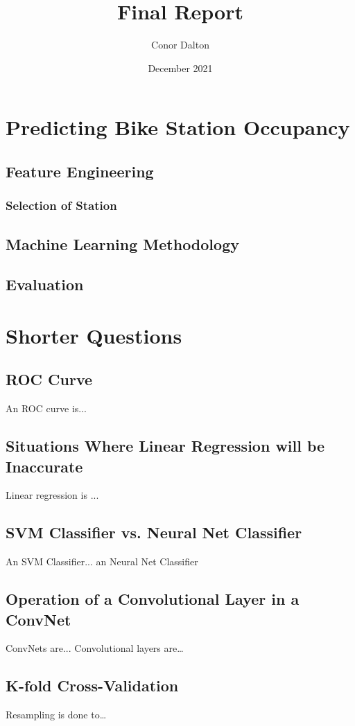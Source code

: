 \documentclass{article}
\title{Final Report}
\author{Conor Dalton}
\date{December 2021}
\begin{document}
\maketitle

\section{Predicting Bike Station Occupancy}
\subsection{Feature Engineering}
\subsubsection{Selection of Station}

\subsection{Machine Learning Methodology}

\subsection{Evaluation}

\section{Shorter Questions}

\subsection{ROC Curve}
An ROC curve is...

\subsection{Situations Where Linear Regression will be Inaccurate}
Linear regression is ... 

\subsection{SVM Classifier vs. Neural Net Classifier}
An SVM Classifier... an Neural Net Classifier

\subsection{Operation of a Convolutional Layer in a ConvNet}
ConvNets are... Convolutional layers are\dots

\subsection{K-fold Cross-Validation}
Resampling is done to\dots



\end{document}
